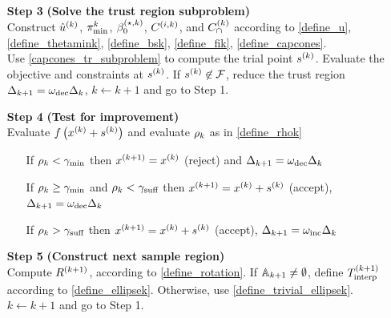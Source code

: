 		\vspace{10cm}
		\newpage
		
		\begin{algorithm}[H]
		\begin{itemize}
            
        \item[\textbf{Step 3}] \textbf{(Solve the trust region subproblem)} \\
        	Construct ${{\hat u}^{(k)}}$, ${\pi^k_{\textrm{min}}}$, ${\beta_0^{(\star, k)}}$, ${C^{(i, k)}}$, and ${C^{(k)}_{\cap}}$ according to
        	\cref{define_u}, \cref{define_thetamink}, \cref{define_bsk}, \cref{define_fik}, \cref{define_capcones}. \\
        	Use \cref{capcones_tr_subproblem} to compute the trial point ${{s}^{(k)}}$.
        	Evaluate the objective and constraints at ${{s}^{(k)}}$.
        	If ${{s}^{(k)}} \not \in {\mathcal F}$, reduce the trust region $\Delta_{k+1} = \omega_{\text{dec}}\Delta_k$, $k \gets k+1$ and go to Step 1.
            
        \item[\textbf{Step 4}] \textbf{(Test for improvement)} \\
            Evaluate $f\left(x^{(k)} + {{s}^{(k)}}\right)$ and evaluate $\rho_k$ as in \cref{define_rhok} \begin{itemize}
                \item[] If $\rho_k < \gamma_{\textrm{min}}$ then ${{x}^{(k+1)}}=x^{(k)}$ (reject) and $\Delta_{k+1} = \omega_{\text{dec}}\Delta_k$
                \item[] If $\rho_k \ge \gamma_{\textrm{min}}$ and $\rho_k < \gamma_{\textrm{suff}}$ then ${{x}^{(k+1)}}=x^{(k)}+{{s}^{(k)}}$ (accept), $\Delta_{k+1} = \omega_{\text{dec}}\Delta_k$
                \item[] If $\rho_k > \gamma_{\textrm{suff}}$ then ${{x}^{(k+1)}}=x^{(k)}+{{s}^{(k)}}$ (accept), $\Delta_{k+1} = \omega_{\text{inc}}\Delta_k$
            \end{itemize}
            
        \item[\textbf{Step 5}] \textbf{(Construct next sample region)} \\
        	Compute ${R^{(k+1)}}$, according to \cref{define_rotation}.
        	If ${\mathbb A_{k+1}} \ne \emptyset$, define ${T_{\text{interp}}^{(k+1)}}$ according to \cref{define_ellipsek}.
        	Otherwise, use \cref{define_trivial_ellipsek}. \\
            $k \gets k+1$ and go to Step 1.
    \end{itemize}
\end{algorithm}







